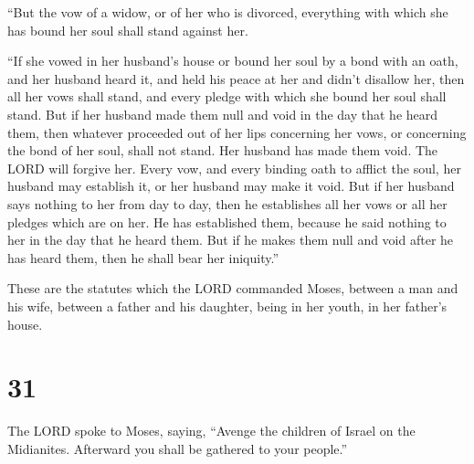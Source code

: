  ``But the vow of a widow, or of her who is divorced,
everything with which she has bound her soul shall stand against her.

 ``If she vowed in her husband's house or bound her soul by
a bond with an oath,  and her husband heard it, and held
his peace at her and didn't disallow her, then all her vows shall stand,
and every pledge with which she bound her soul shall stand.
 But if her husband made them null and void in the day that
he heard them, then whatever proceeded out of her lips concerning her
vows, or concerning the bond of her soul, shall not stand. Her husband
has made them void. The LORD will forgive her.  Every vow,
and every binding oath to afflict the soul, her husband may establish
it, or her husband may make it void.  But if her husband
says nothing to her from day to day, then he establishes all her vows or
all her pledges which are on her. He has established them, because he
said nothing to her in the day that he heard them.  But if
he makes them null and void after he has heard them, then he shall bear
her iniquity.''

 These are the statutes which the LORD commanded Moses,
between a man and his wife, between a father and his daughter, being in
her youth, in her father's house.

\hypertarget{section-30}{%
\section{31}\label{section-30}}

 The LORD spoke to Moses, saying,  ``Avenge the
children of Israel on the Midianites. Afterward you shall be gathered to
your people.''

